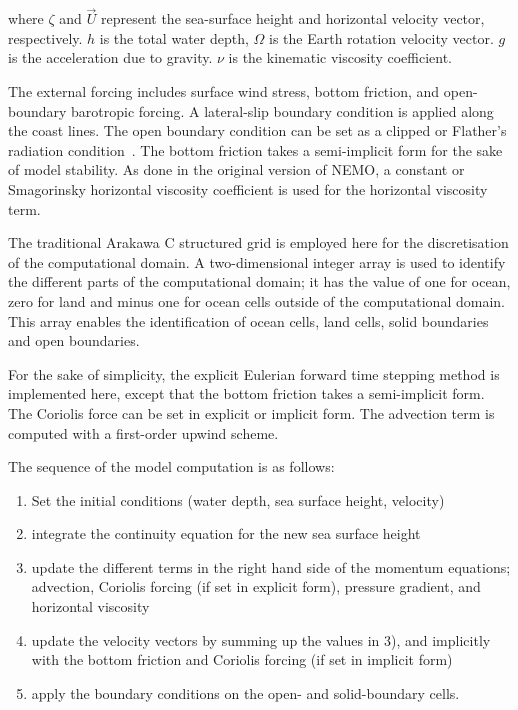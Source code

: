 \documentclass[journal]{IEEEtran}
\begin{document}
where $\zeta$ and $\vec{U}$ represent the sea-surface height and
horizontal velocity vector, respectively. $h$ is the total water
depth, $\Omega$ is the Earth rotation velocity vector.  $g$ is the
acceleration due to gravity. $\nu$ is the kinematic viscosity coefficient.

The external forcing includes surface wind stress, bottom friction,
and open-boundary barotropic forcing. A lateral-slip boundary
condition is applied along the coast lines. The open boundary
condition can be set as a clipped or Flather's radiation
condition~\cite{flather76}. The bottom friction takes a semi-implicit
form for the sake of model stability. As done in the original version
of NEMO, a constant or Smagorinsky horizontal viscosity coefficient is
used for the horizontal viscosity term.

The traditional Arakawa C structured grid is employed here for the
discretisation of the computational domain. A two-dimensional integer
array is used to identify the different parts of the computational
domain; it has the value of one for ocean, zero for land and minus
one for ocean cells outside of the computational domain. This array
enables the identification of ocean cells, land cells, solid boundaries
and open boundaries.

For the sake of simplicity, the explicit Eulerian forward time
stepping method is implemented here, except that the bottom friction
takes a semi-implicit form.  The Coriolis force can be set in explicit
or implicit form. The advection term is computed with a first-order
upwind scheme.

The sequence of the model computation is as follows:
\begin{enumerate}
\item Set the initial conditions (water depth, sea surface height, velocity)
\item integrate the continuity equation for the new sea surface height
\item update the different terms in the right hand side of the momentum equations; advection, Coriolis forcing (if set in explicit form), pressure gradient, and horizontal viscosity
\item update the velocity vectors by summing up the values in 3), and implicitly with the bottom friction and Coriolis forcing (if set in implicit form)
\item apply the boundary conditions on the open- and solid-boundary cells.
\end{enumerate}
\end{document}
